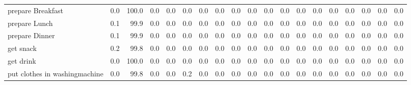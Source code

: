 \documentclass{article}
\begin{document}
\begin{sideways}
\begin{tabular}{lrrrrrrrrrrrrrrrrrr}
prepare Breakfast             &         0.0 &              100.0 &           0.0 &                          0.0 &                0.0 &                0.0 &                        0.0 &          0.0 &              0.0 &                0.0 &                    0.0 &                      0.0 &                  0.0 &                   0.0 &              0.0 &              0.0 &                                  0.0 &          0.0 \\
prepare Lunch                 &         0.1 &               99.9 &           0.0 &                          0.0 &                0.0 &                0.0 &                        0.0 &          0.0 &              0.0 &                0.0 &                    0.0 &                      0.0 &                  0.0 &                   0.0 &              0.0 &              0.0 &                                  0.0 &          0.0 \\
prepare Dinner                &         0.1 &               99.9 &           0.0 &                          0.0 &                0.0 &                0.0 &                        0.0 &          0.0 &              0.0 &                0.0 &                    0.0 &                      0.0 &                  0.0 &                   0.0 &              0.0 &              0.0 &                                  0.0 &          0.0 \\
get snack                     &         0.2 &               99.8 &           0.0 &                          0.0 &                0.0 &                0.0 &                        0.0 &          0.0 &              0.0 &                0.0 &                    0.0 &                      0.0 &                  0.0 &                   0.0 &              0.0 &              0.0 &                                  0.0 &          0.0 \\
get drink                     &         0.0 &              100.0 &           0.0 &                          0.0 &                0.0 &                0.0 &                        0.0 &          0.0 &              0.0 &                0.0 &                    0.0 &                      0.0 &                  0.0 &                   0.0 &              0.0 &              0.0 &                                  0.0 &          0.0 \\
put clothes in washingmachine &         0.0 &               99.8 &           0.0 &                          0.0 &                0.2 &                0.0 &                        0.0 &          0.0 &              0.0 &                0.0 &                    0.0 &                      0.0 &                  0.0 &                   0.0 &              0.0 &              0.0 &                                  0.0 &          0.0 \\

\end{tabular}
\end{sideways}
\end{document}
